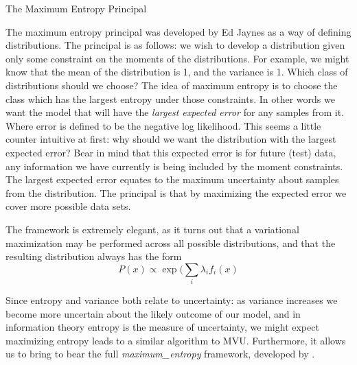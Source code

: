 \begin{boxfloat}
\caption{The Maximum Entropy Principal}\label{box:maxent}

The maximum entropy principal was developed by Ed Jaynes as a way of
defining distributions. The principal is as follows: we wish to
develop a distribution given only some constraint on the moments of
the distributions. For example, we might know that the mean of the
distribution is 1, and the variance is 1. Which class of distributions
should we choose? The idea of maximum entropy is to choose the class
which has the largest entropy under those constraints. In other words
we want the model that will have the \emph{largest expected error} for
any samples from it. Where error is defined to be the negative log
likelihood. This seems a little counter intuitive at first: why should
we want the distribution with the largest expected error? Bear in mind
that this expected error is for future (test) data, any information we
have currently is being included by the moment constraints. The
largest expected error equates to the maximum uncertainty about
samples from the distribution. The principal is that by maximizing the
expected error we cover more possible data sets.

The framework is extremely elegant, as it turns out that a variational
maximization may be performed across all possible distributions, and
that the resulting distribution always has the form
\[
P(x) \propto \exp(\sum_i \lambda_i f_i(x)
\]
\end{boxfloat}

Since entropy and variance both relate to uncertainty: as variance
increases we become more uncertain about the likely outcome of our
model, and in information theory entropy is the measure of
uncertainty, we might expect maximizing entropy leads to a similar
algorithm to MVU. Furthermore, it allows us to bring to bear the full
\emph{\gls{maximum_entropy}} framework, developed by
\citealp{Jaynes:bayes86}.

